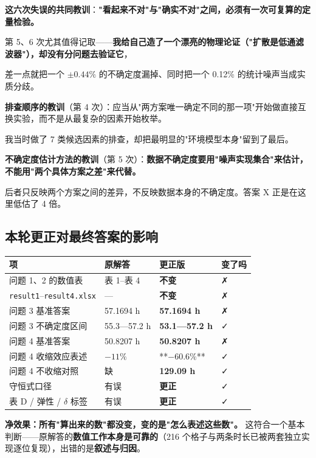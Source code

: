 \textbf{这六次失误的共同教训}：\textbf{"看起来不对"与"确实不对"之间，必须有一次可复算的定量检验。}

第 5、6 次尤其值得记取——\textbf{我给自己造了一个漂亮的物理论证（"扩散是低通滤波器"），却没有分问题去验证它}，

差一点就把一个 $\pm0.44\%$ 的不确定度漏掉、同时把一个 0.12\% 的统计噪声当成实质分歧。


\textbf{排查顺序的教训}（第 4 次）：应当从"两方案唯一确定不同的那一项"开始做直接互换实验，而不是从最复杂的因素开始枚举。

我当时做了 7 类候选因素的排查，却把最明显的"环境模型本身"留到了最后。


\textbf{不确定度估计方法的教训}（第 5 次）：\textbf{数据不确定度要用"噪声实现集合"来估计，不能用"两个具体方案之差"来代替。}

后者只反映两个方案之间的差异，不反映数据本身的不确定度。答案 X 正是在这里低估了 4 倍。


\subsection{本轮更正对最终答案的影响}


\begin{center}
\small
\begin{tabular}{llll}
\toprule
项 & 原解答 & 更正版 & 变了吗 \\
\midrule
问题 1、2 的数值表 & 表 1–表 4 & \textbf{不变} & ✗ \\
\texttt{result1}–\texttt{result4.xlsx} & — & \textbf{不变} & ✗ \\
问题 3 基准答案 & 57.1694 h & \textbf{57.1694 h} & ✗ \\
问题 3 不确定度区间 & 55.3—57.2 h & \textbf{53.1—57.2 h} & ✓ \\
问题 4 基准答案 & 50.8207 h & \textbf{50.8207 h} & ✗ \\
问题 4 收缩效应表述 & $-11\%$ & **$-60.6\%$** & ✓ \\
问题 4 不收缩对照 & 缺 & \textbf{129.09 h} & ✓ \\
守恒式口径 & 有误 & \textbf{更正} & ✓ \\
表 D / 弹性 / $\delta$ 标签 & 有误 & \textbf{更正} & ✓ \\
\bottomrule
\end{tabular}
\end{center}


\textbf{净效果：所有"算出来的数"都没变，变的是"怎么表述这些数"。} 这符合一个基本判断——原解答的\textbf{数值工作本身是可靠的}（216 个格子与两条时长已被两套独立实现逐位复现），出错的是\textbf{叙述与归因}。


